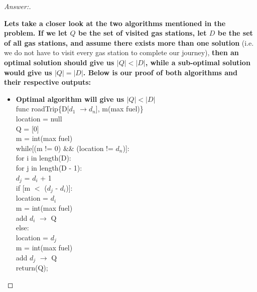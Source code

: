 \documentclass[11pt]{article}
\theoremstyle{definition}
\theoremstyle{definition}
\theoremstyle{definition}
\begin{document}
\begin{proof}[Answer:] \
\item \textbf{Lets take a closer look at the two algorithms mentioned in the problem. If we let $Q$ be the set of visited gas stations, let $D$ be the set of all gas stations, and assume there exists more than one solution} (i.e. we do not have to visit every gas station to complete our journey), \textbf{then an optimal solution should give us $|Q| < |D|$, while a sub-optimal solution would give us $|Q| = |D|$. Below is our proof of both algorithms and their respective outputs:}
\begin{itemize}
\item \textbf{Optimal algorithm will give us $|Q| < |D|$} \\
func roadTrip\{D[$d_{1}$ $\to$$d_{n}$], m(max fuel)\} \\
\hspace*{2mm} location = null \\
\hspace*{2mm} Q = [0] \\
\hspace*{2mm} m = int(max fuel) \\
\hspace*{2mm} while[(m != 0) \&\& (location != $d_{n}$)]: \\
\hspace*{4mm} for i in length(D): \\
\hspace*{6mm} for j in length(D - 1): \\
\hspace*{8mm} $d_{j}$ = $d_{i}$ + 1 \\
\hspace*{8mm} if [m $<$ ($d_{j}$ - $d_{i}$)]: \\
\hspace*{10mm} location = $d_{i}$ \\
\hspace*{10mm} m = int(max fuel) \\
\hspace*{10mm} add $d_{i}$ $\to$ Q \\
\hspace*{8mm} else: \\
\hspace*{10mm} location = $d_{j}$ \\
\hspace*{10mm} m = int(max fuel) \\
\hspace*{10mm} add $d_{j}$ $\to$ Q \\
return(Q);


\end{itemize}
\end{proof}
\end{document}
